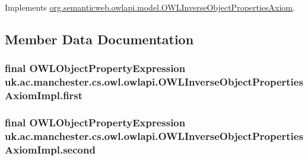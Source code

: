 Implements \hyperlink{interfaceorg_1_1semanticweb_1_1owlapi_1_1model_1_1_o_w_l_inverse_object_properties_axiom_a7b45061090bc0945d82551a7ab1be779}{org.\-semanticweb.\-owlapi.\-model.\-O\-W\-L\-Inverse\-Object\-Properties\-Axiom}.



\subsection{Member Data Documentation}
\hypertarget{classuk_1_1ac_1_1manchester_1_1cs_1_1owl_1_1owlapi_1_1_o_w_l_inverse_object_properties_axiom_impl_ada71fd5f5ef70e63d611fbe578e67eef}{
\subsubsection[{first}]{\setlength{\rightskip}{0pt plus 5cm}final {\bf O\-W\-L\-Object\-Property\-Expression} uk.\-ac.\-manchester.\-cs.\-owl.\-owlapi.\-O\-W\-L\-Inverse\-Object\-Properties\-Axiom\-Impl.\-first\hspace{0.3cm}{\ttfamily [private]}}}\label{classuk_1_1ac_1_1manchester_1_1cs_1_1owl_1_1owlapi_1_1_o_w_l_inverse_object_properties_axiom_impl_ada71fd5f5ef70e63d611fbe578e67eef}
\hypertarget{classuk_1_1ac_1_1manchester_1_1cs_1_1owl_1_1owlapi_1_1_o_w_l_inverse_object_properties_axiom_impl_a374ea4f80e6d00fb7cf293e560f9dae1}{
\subsubsection[{second}]{\setlength{\rightskip}{0pt plus 5cm}final {\bf O\-W\-L\-Object\-Property\-Expression} uk.\-ac.\-manchester.\-cs.\-owl.\-owlapi.\-O\-W\-L\-Inverse\-Object\-Properties\-Axiom\-Impl.\-second\hspace{0.3cm}{\ttfamily [private]}}}\label{classuk_1_1ac_1_1manchester_1_1cs_1_1owl_1_1owlapi_1_1_o_w_l_inverse_object_properties_axiom_impl_a374ea4f80e6d00fb7cf293e560f9dae1}
